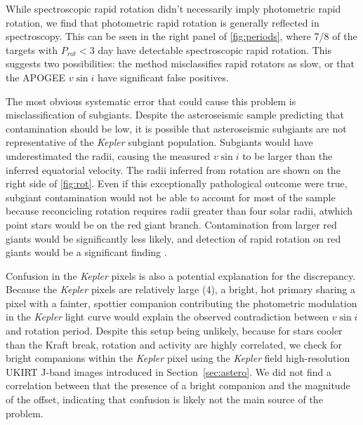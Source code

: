 \documentclass[manuscript]{aastex6}
\newcommand{\vsini}{\ensuremath{v \sin i}}
\newcommand{\Kepler}{\mbox{\textit{Kepler}}}
\begin{document}
While spectroscopic rapid rotation didn't necessarily imply photometric
rapid rotation, we find that photometric rapid rotation is generally
reflected in spectroscopy. This can be seen in the right panel of
\cref{fig:periods}, where 7/8 of the targets with \(P_{rot} < 3\) day
have detectable spectroscopic rapid rotation. This suggests two
possibilities: the \citep{McQuillan14} method misclassifies rapid
rotators as slow, or that the APOGEE \vsini{} have significant false
positives.

The most obvious systematic error that could cause this problem is
misclassification of subgiants. Despite the asteroseismic sample
predicting that contamination should be low, it is possible that 
asteroseismic subgiants are not representative of the \Kepler{} subgiant 
population. Subgiants would have underestimated the radii, causing the 
measured \vsini{} to be larger than the inferred equatorial velocity.
The radii inferred from rotation are shown on the right side of
\cref{fig:rot}. Even if this
exceptionally pathological outcome were true, subgiant contamination
would not be able to account for most of the sample because reconcicling
rotation requires radii greater than four solar radii, atwhich point
stars would be on the red giant branch. Contamination from larger red giants 
would be significantly less likely, and detection of rapid rotation on red 
giants would be a significant finding \citep{Tayar15}.

Confusion in the \Kepler{} pixels is also a potential explanation for the
discrepancy. Because the \Kepler{} pixels are relatively large (4\arcsec), a 
bright, hot primary sharing a pixel with a fainter, spottier companion 
contributing the photometric modulation in the
\Kepler{} light curve would explain the observed contradiction between
\vsini{} and rotation period. Despite this setup being unlikely, because for 
stars cooler than the Kraft break, rotation and activity are highly 
correlated, we check for bright companions
within the \Kepler{} pixel using the \Kepler{} field high-resolution UKIRT
J-band images introduced in Section~\ref{sec:astero}. We did not find a 
correlation between that the presence of a bright companion and the magnitude 
of the offset, indicating that confusion is likely not the main source of the 
problem.
\end{document}

